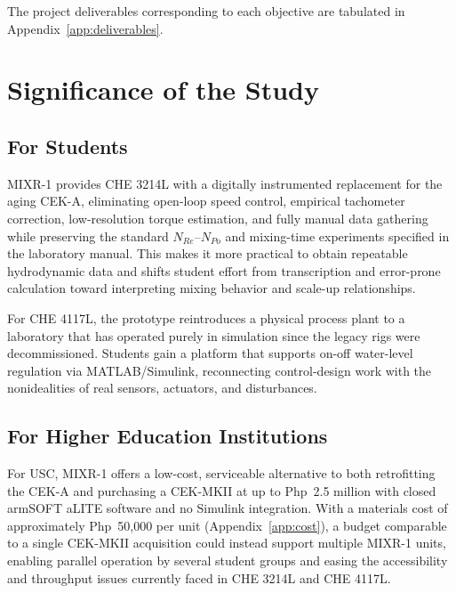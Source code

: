 The project deliverables corresponding to each objective are tabulated in Appendix~\ref{app:deliverables}.


\section{Significance of the Study}  %
\label{sec:significance}

\subsection{For Students} %

MIXR-1 provides CHE 3214L with a digitally instrumented replacement for the aging CEK-A, eliminating open-loop speed control, empirical tachometer correction, low-resolution torque estimation, and fully manual data gathering while preserving the standard $N_{Re}$--$N_{Po}$ and mixing-time experiments specified in the laboratory manual. This makes it more practical to obtain repeatable hydrodynamic data and shifts student effort from transcription and error-prone calculation toward interpreting mixing behavior and scale-up relationships.

For CHE 4117L, the prototype reintroduces a physical process plant to a laboratory that has operated purely in simulation since the legacy rigs were decommissioned. Students gain a platform that supports on-off water-level regulation via MATLAB/Simulink, reconnecting control-design work with the nonidealities of real sensors, actuators, and disturbances.

\subsection{For Higher Education Institutions} %

For USC, MIXR-1 offers a low-cost, serviceable alternative to both retrofitting the CEK-A and purchasing a CEK-MKII at up to Php~2.5 million with closed armSOFT aLITE software and no Simulink integration. With a materials cost of approximately Php~50,000 per unit (Appendix~\ref{app:cost}), a budget comparable to a single CEK-MKII acquisition could instead support multiple MIXR-1 units, enabling parallel operation by several student groups and easing the accessibility and throughput issues currently faced in CHE 3214L and CHE 4117L.


